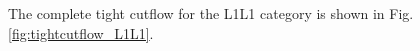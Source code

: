 The complete tight cutflow for the L1L1 category is shown in Fig. \ref{fig:tightcutflow_L1L1}. %





